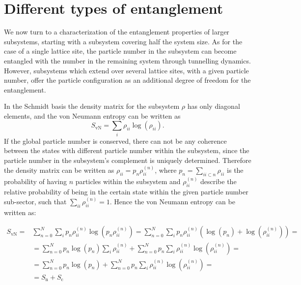 \section{Different types of entanglement}

We now turn to a characterization of the entanglement properties of larger subsystems, starting with a subsystem covering half the system size. As for the case of a single lattice site, the particle number in the subsystem can become entangled with the number in the remaining system through tunnelling dynamics. However, subsystems which extend over several lattice sites, with a given particle number, offer the particle configuration as an additional degree of freedom for the entanglement. 

In the Schmidt basis the density matrix for the subsystem $\rho$ has only diagonal elements, and the von Neumann entropy can be written as
\begin{equation}
S_\text{vN}=\sum_i \rho_{ii} \log {\left ( \rho_{ii} \right )}.
\end{equation}
If the global particle number is conserved, there can not be any coherence between the states with different particle number
within the subsystem, since the particle number in the subsystem's complement is uniquely determined. Therefore  the density matrix can be written as $\rho_{ii} = p_n \rho_{ii}^{(n)}$, where $p_n = \sum_{ii \subset n} \rho_{ii}$ is the probability of having $n$ particles within the subsystem and $\rho_{ii}^{(n)}$ describe the relative probability of being in the certain state within the given particle number sub-sector, such that $\sum_{ii} \rho_{ii}^{(n)}=1$. Hence the von Neumann entropy can be written as:

\begin{equation}
\begin{aligned}
S_\text{vN}=&\sum_{n=0}^N \sum_i p_n  \rho_{ii}^{(n)} \log {\left (p_n \rho_{ii}^{(n)} \right )}=\sum_{n=0}^N \sum_i p_n  \rho_{ii}^{(n)} \left (\log{\left ( p_n \right )} + \log {\left ( \rho_{ii}^{(n)} \right )} \right ) = \\
&=\sum_{n=0}^N p_n  \log{\left ( p_n \right )}  \sum_i \rho_{ii}^{(n)} + \sum_{n=0}^N p_n \sum_{i} \rho_{ii}^{(n)} \log {\left ( \rho_{ii}^{(n)} \right )} = \\
&=\sum_{n=0}^N p_n  \log{\left ( p_n \right )}  + \sum_{n=0}^N p_n \sum_{i} \rho_{ii}^{(n)} \log {\left ( \rho_{ii}^{(n)} \right )}=\\
&=S_\text{n} + S_\text{c}
\end{aligned}
\end{equation}


